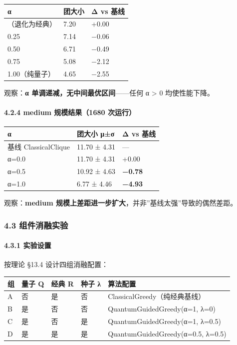 \documentclass[
  11pt,
]{ctexart}
\newcounter{none} %
\begin{document}
{\def\LTcaptype{none} %
\begin{longtable}[]{@{}lll@{}}
\toprule\noalign{}
α & 团大小 & Δ vs 基线 \\
\midrule\noalign{}
\endhead
\bottomrule\noalign{}
\endlastfoot
0.00（退化为经典） & 7.20 & +0.00 \\
0.25 & 7.14 & −0.06 \\
0.50 & 6.71 & −0.49 \\
0.75 & 5.08 & −2.12 \\
1.00（纯量子） & 4.65 & −2.55 \\
\end{longtable}
}

观察：\textbf{α 单调递减，无中间最优区间}------任何 α \textgreater{} 0
均使性能下降。

\paragraph{4.2.4 medium 规模结果（1680
次运行）}\label{medium-ux89c4ux6a21ux7ed3ux679c1680-ux6b21ux8fd0ux884c}

{\def\LTcaptype{none} %
\begin{longtable}[]{@{}lll@{}}
\toprule\noalign{}
α & 团大小 μ±σ & Δ vs 基线 \\
\midrule\noalign{}
\endhead
\bottomrule\noalign{}
\endlastfoot
基线 ClassicalClique & 11.70 ± 4.31 & --- \\
α=0.0 & 11.70 ± 4.31 & +0.00 \\
α=0.5 & 10.92 ± 4.63 & \textbf{−0.78} \\
α=1.0 & 6.77 ± 4.46 & \textbf{−4.93} \\
\end{longtable}
}

观察：\textbf{medium
规模上差距进一步扩大}，并非''基线太强''导致的偶然差距。

\subsubsection{4.3
组件消融实验}\label{ux7ec4ux4ef6ux6d88ux878dux5b9eux9a8c}

\paragraph{4.3.1 实验设置}\label{ux5b9eux9a8cux8bbeux7f6e-2}

按理论 §13.4 设计四组消融配置：

{\def\LTcaptype{none} %
\begin{longtable}[]{@{}lllll@{}}
\toprule\noalign{}
组 & 量子 Q & 经典 R & 种子 λ & 算法配置 \\
\midrule\noalign{}
\endhead
\bottomrule\noalign{}
\endlastfoot
A & 否 & 是 & 否 & ClassicalGreedy（纯经典基线） \\
B & 是 & 否 & 否 & QuantumGuidedGreedy(α=1, λ=0) \\
C & 是 & 否 & 是 & QuantumGuidedGreedy(α=1, λ=0.5) \\
D & 是 & 是 & 是 & QuantumGuidedGreedy(α=0.5, λ=0.5) \\
\end{longtable}
}
\end{document}
